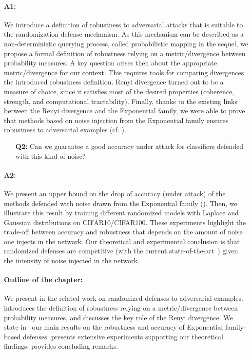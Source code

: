 \paragraph{A1:}
We introduce a definition of robustness to adversarial attacks that is suitable to the randomization defense mechanism.
As this mechanism can be  described as a non-deterministic querying process, called probabilistic mapping in the sequel, we propose a formal definition of robustness relying on a metric/divergence between probability measures.
A key question arises then about the appropriate metric/divergence for our context.
This requires tools for comparing divergences \wrt the introduced robustness definition.
Renyi divergence turned out to be a measure of choice, since it satisfies most of the desired properties  (coherence, strength, and computational tractability).
Finally, thanks to the existing links between the Renyi divergence and the Exponential family, we were able to prove  that methods based on noise injection from the Exponential family  ensures robustness to adversarial examples (cf. ).
\begin{itemize}
    \item[\textbf{Q2:}] Can we guarantee a good accuracy under attack for classifiers defended with this kind of noise? 
\end{itemize}

\paragraph{A2:}
We present an upper bound on the drop of accuracy (under attack) of the methods defended with noise drawn from the Exponential family (\cf {}).
Then, we illustrate this result by training different randomized models with Laplace and Gaussian distributions on CIFAR10/CIFAR100.
These experiments highlight the trade-off between accuracy and robustness that depends on the amount of noise one injects in the network.
Our theoretical and experimental conclusion is that randomized defenses are competitive (with the current state-of-the-art~\cite{madry2018towards}) given the intensity of noise injected in the network.

\paragraph{Outline of the chapter:}
We present in  the related work on randomized defenses to adversarial examples.
 introduces the definition of robustness relying on a metric/divergence between probability measures, and discusses the key role of the Renyi divergence.
We state in~ our main results on the robustness and accuracy of Exponential family-based defenses.
 presents extensive experiments supporting our theoretical findings.
 provides concluding remarks.

